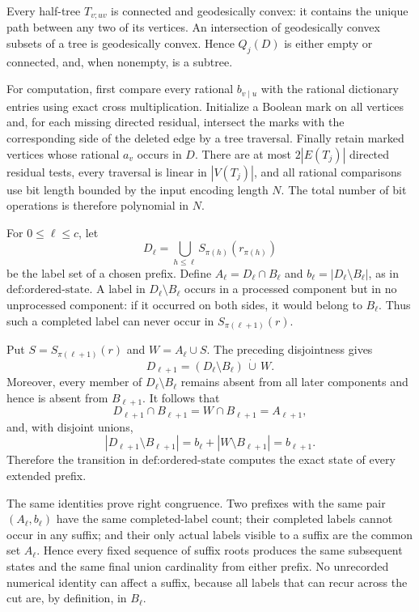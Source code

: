 Every half-tree \(T_{v;uv}\) is connected and geodesically convex: it contains the unique path between any two of its vertices.  An intersection of geodesically convex subsets of a tree is geodesically convex.  Hence \(Q_j(D)\) is either empty or connected, and, when nonempty, is a subtree.

For computation, first compare every rational \(b_{v\mid u}\) with the rational dictionary entries using exact cross multiplication.  Initialize a Boolean mark on all vertices and, for each missing directed residual, intersect the marks with the corresponding side of the deleted edge by a tree traversal.  Finally retain marked vertices whose rational \(a_v\) occurs in \(D\).  There are at most \(2|E(T_j)|\) directed residual tests, every traversal is linear in \(|V(T_j)|\), and all rational comparisons use bit length bounded by the input encoding length \(N\).  The total number of bit operations is therefore polynomial in \(N\).

For \(0\le\ell\le c\), let
\[
 D_\ell=\bigcup_{h\le\ell}S_{\pi(h)}(r_{\pi(h)})
\]
be the label set of a chosen prefix.  Define \(A_\ell=D_\ell\cap B_\ell\) and \(b_\ell=|D_\ell\setminus B_\ell|\), as in \(\text{def:ordered-state}\).  A label in \(D_\ell\setminus B_\ell\) occurs in a processed component but in no unprocessed component: if it occurred on both sides, it would belong to \(B_\ell\).  Thus such a completed label can never occur in \(S_{\pi(\ell+1)}(r)\).

Put \(S=S_{\pi(\ell+1)}(r)\) and \(W=A_\ell\cup S\).  The preceding disjointness gives
\[
 D_{\ell+1}=(D_\ell\setminus B_\ell)\,\dot\cup\,W.
\]
Moreover, every member of \(D_\ell\setminus B_\ell\) remains absent from all later components and hence is absent from \(B_{\ell+1}\).  It follows that
\[
 D_{\ell+1}\cap B_{\ell+1}=W\cap B_{\ell+1}=A_{\ell+1},
\]
and, with disjoint unions,
\[
 |D_{\ell+1}\setminus B_{\ell+1}|
 =b_\ell+|W\setminus B_{\ell+1}|=b_{\ell+1}.
\]
Therefore the transition in \(\text{def:ordered-state}\) computes the exact state of every extended prefix.

The same identities prove right congruence.  Two prefixes with the same pair \((A_\ell,b_\ell)\) have the same completed-label count; their completed labels cannot occur in any suffix; and their only actual labels visible to a suffix are the common set \(A_\ell\).  Hence every fixed sequence of suffix roots produces the same subsequent states and the same final union cardinality from either prefix.  No unrecorded numerical identity can affect a suffix, because all labels that can recur across the cut are, by definition, in \(B_\ell\).

